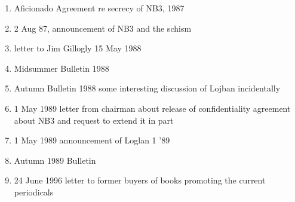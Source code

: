 \documentclass[12pt]{article}
\begin{document}
\begin{description}
\begin{enumerate}
\item Aficionado Agreement re secrecy of NB3, 1987

\item 2 Aug 87, announcement of NB3 and the schism

\item letter to Jim Gillogly 15 May 1988

\item Midsummer Bulletin 1988

\item Autumn Bulletin 1988 some interesting discussion of Lojban incidentally

\item 1 May 1989 letter from chairman about release of confidentiality agreement about NB3 and request to extend it in part

\item  1 May 1989 announcement of Loglan 1 '89

\item Autumn 1989 Bulletin

\item 24 June 1996 letter to former buyers of books promoting the current periodicals

















\end{enumerate}


\end{description}
\end{document}
